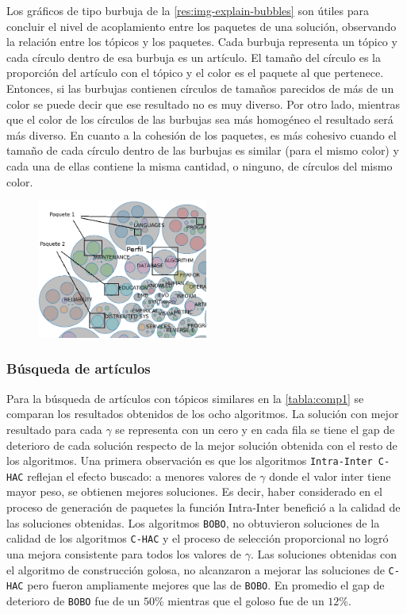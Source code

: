 Los gráficos de tipo burbuja de la \autoref{res:img-explain-bubbles} son útiles para concluir el nivel de acoplamiento entre los paquetes de una solución, observando la relación entre los tópicos y los paquetes. Cada burbuja representa un tópico y cada círculo dentro de esa burbuja es un artículo. El tamaño del círculo es la proporción del artículo con el tópico y el color es el paquete al que pertenece. Entonces, si las burbujas contienen círculos de tamaños parecidos de más de un color se puede decir que ese resultado no es muy diverso. Por otro lado, mientras que el color de los círculos de las burbujas sea más homogéneo el resultado será más diverso. En cuanto a la cohesión de los paquetes, es más cohesivo cuando el tamaño de cada círculo dentro de las burbujas es similar (para el mismo color) y cada una de ellas contiene la misma cantidad, o ninguno, de círculos del mismo color.

\begin{figure}[H]
  \centering
    \includegraphics[width=0.5\textwidth]{img/explain-bubbles.png}
  \caption{}
  \label{res:img-explain-bubbles}
\end{figure}

\subsubsection{Búsqueda de artículos}
Para la búsqueda de artículos con tópicos similares en la \autoref{tabla:comp1} se comparan los resultados obtenidos de los ocho algoritmos. La solución con mejor resultado para cada $\gamma$ se representa con un cero y en cada fila se tiene el gap de deterioro de cada solución respecto de la mejor solución obtenida con el resto de los algoritmos. Una primera observación es que los algoritmos \texttt{Intra-Inter C-HAC} reflejan el efecto buscado: a menores valores de $\gamma$ donde el valor inter tiene mayor peso, se obtienen mejores soluciones. Es decir, haber considerado en el proceso de generación de paquetes la función Intra-Inter benefició a la calidad de las soluciones obtenidas. Los algoritmos \texttt{BOBO}, no obtuvieron soluciones de la calidad de los algoritmos \texttt{C-HAC} y el proceso de selección proporcional no logró una mejora consistente para todos los valores de $\gamma$. Las soluciones obtenidas con el algoritmo de construcción golosa, no alcanzaron a mejorar las soluciones de \texttt{C-HAC} pero fueron ampliamente mejores que las de \texttt{BOBO}. En promedio el gap de deterioro de \texttt{BOBO} fue de un $50\%$ mientras que el goloso fue de un $12\%$. 

